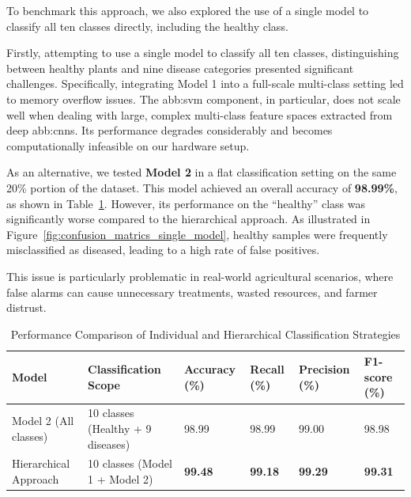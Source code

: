 To benchmark this approach, we also explored the use of a single model to classify all ten classes directly, including the healthy class.

Firstly, attempting to use a single model to classify all ten classes, distinguishing between healthy plants and nine disease categories presented significant challenges. Specifically, integrating Model 1 into a full-scale multi-class setting led to memory overflow issues. The \gls{abb:svm} component, in particular, does not scale well when dealing with large, complex multi-class feature spaces extracted from deep \gls{abb:cnn}s. Its performance degrades considerably and becomes computationally infeasible on our hardware setup.

As an alternative, we tested \textbf{Model 2} in a flat classification setting on the same 20\% portion of the dataset. This model achieved an overall accuracy of \textbf{98.99\%}, as shown in Table~\ref{tab:single-hierarchical}. However, its performance on the “healthy” class was significantly worse compared to the hierarchical approach. As illustrated in Figure~\ref{fig:confusion_matrics_single_model}, healthy samples were frequently misclassified as diseased, leading to a high rate of false positives.

This issue is particularly problematic in real-world agricultural scenarios, where false alarms can cause unnecessary treatments, wasted resources, and farmer distrust.

\begin{table}[H]
\centering
\renewcommand{\arraystretch}{1.3}
\setlength{\tabcolsep}{6pt}
\caption{Performance Comparison of Individual and Hierarchical Classification Strategies}
\begin{tabular}{|p{3.5cm}|p{3.7cm}|p{1.9cm}|p{1.9cm}|p{1.9cm}|p{1.9cm}|}
\hline
\textbf{Model} & \textbf{Classification Scope} & \textbf{Accuracy (\%)} & \textbf{Recall (\%)} & \textbf{Precision (\%)} & \textbf{F1-score (\%)} \\
\hline
Model 2 (All classes) & 10 classes (Healthy + 9 diseases) & 98.99 & 98.99 & 99.00 & 98.98 \\
\hline
Hierarchical Approach & 10 classes (Model 1 + Model 2) & \textbf{99.48} & \textbf{99.18} & \textbf{99.29} & \textbf{99.31} \\
\hline
\end{tabular}
\label{tab:single-hierarchical}
\end{table}




\vspace{0.5cm} %


